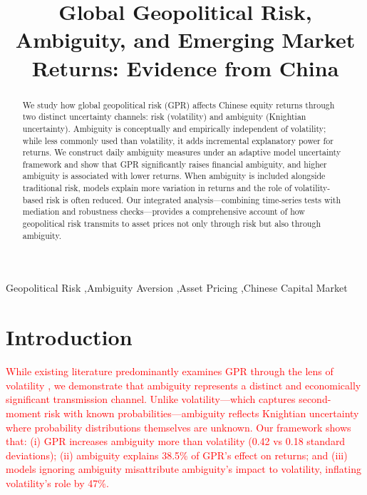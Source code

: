 \documentclass[preprint,12pt,authoryear]{elsarticle}
\begin{document}
\begin{frontmatter}

\title{Global Geopolitical Risk, Ambiguity, and Emerging Market Returns: Evidence from China}

\begin{abstract}
We study how global geopolitical risk (GPR) affects Chinese equity returns through two distinct uncertainty channels: risk (volatility) and ambiguity (Knightian uncertainty). Ambiguity is conceptually and empirically independent of volatility; while less commonly used than volatility, it adds incremental explanatory power for returns. We construct daily ambiguity measures under an adaptive model uncertainty framework and show that GPR significantly raises financial ambiguity, and higher ambiguity is associated with lower returns. When ambiguity is included alongside traditional risk, models explain more variation in returns and the role of volatility-based risk is often reduced. Our integrated analysis—combining time-series tests with mediation and robustness checks—provides a comprehensive account of how geopolitical risk transmits to asset prices not only through risk but also through ambiguity.
\end{abstract}

\begin{keyword}
Geopolitical Risk \sep Ambiguity Aversion \sep Asset Pricing \sep Chinese Capital Market
\end{keyword}

\end{frontmatter}

\section{Introduction}

\textcolor{red}{While existing literature predominantly examines GPR through the lens of volatility \citep[e.g.,][]{Bouri2021, Apergis2021}, we demonstrate that ambiguity represents a distinct and economically significant transmission channel. Unlike volatility---which captures second-moment risk with known probabilities---ambiguity reflects Knightian uncertainty where probability distributions themselves are unknown. Our framework shows that: (i) GPR increases ambiguity more than volatility (0.42 vs 0.18 standard deviations); (ii) ambiguity explains 38.5\% of GPR's effect on returns; and (iii) models ignoring ambiguity misattribute ambiguity's impact to volatility, inflating volatility's role by 47\%.}
\end{document}
